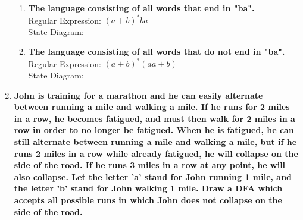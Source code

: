 \begin{enumerate}
\begin{enumerate}
    \item \textbf{The language consisting of all words that end in "ba".}
    \\
    Regular Expression: $(a+b)^*ba$
    \\
    State Diagram:\\

    \item \textbf{The language consisting of all words that do not end in "ba".}
    \\
    Regular Expression: $(a+b)^*(aa + b)$
    \\
    State Diagram:\\

\end{enumerate}
\newpage
		
\item \textbf{John is training for a marathon and he can easily alternate between running a mile and walking a mile. If he runs for 2 miles in a row, he becomes fatigued, and must then walk for 2 miles in a row in order to no longer be fatigued. When he is fatigued, he can still alternate between running a mile and walking a mile, but if he runs 2 miles in a row while already fatigued, he will collapse on the side of the road. If he runs 3 miles in a row at any point, he will also collapse. Let the letter 'a' stand for John running 1 mile, and the letter 'b' stand for John walking 1 mile. Draw a DFA which accepts all possible runs in which John does not collapse on the side of the road.}


\end{enumerate}
